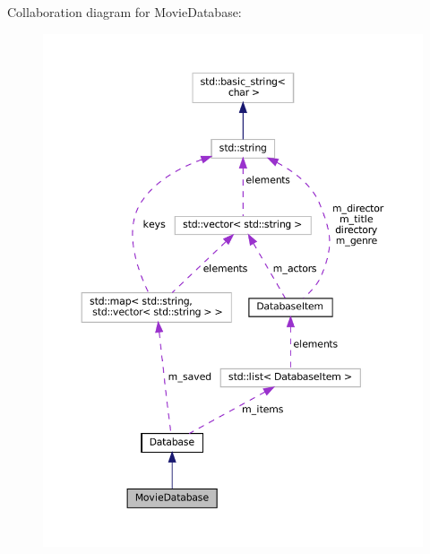 Collaboration diagram for Movie\+Database\+:
\nopagebreak
\begin{figure}[H]
\begin{center}
\leavevmode
\includegraphics[width=350pt]{classMovieDatabase__coll__graph}
\end{center}
\end{figure}
